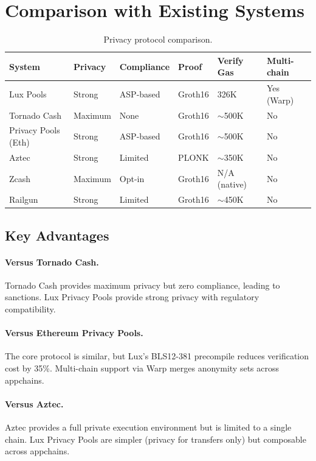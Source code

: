 \section{Comparison with Existing Systems}
\label{sec:comparison}

\begin{table}[H]
\centering
\caption{Privacy protocol comparison.}
\label{tab:comparison}
\begin{tabular}{p{2.2cm}p{1.8cm}p{1.8cm}p{1.8cm}p{2cm}p{2cm}}
\toprule
\textbf{System} & \textbf{Privacy} & \textbf{Compliance} & \textbf{Proof} & \textbf{Verify Gas} & \textbf{Multi-chain} \\
\midrule
Lux Pools & Strong & ASP-based & Groth16 & 326K & Yes (Warp) \\
Tornado Cash & Maximum & None & Groth16 & $\sim$500K & No \\
Privacy Pools (Eth) & Strong & ASP-based & Groth16 & $\sim$500K & No \\
Aztec & Strong & Limited & PLONK & $\sim$350K & No \\
Zcash & Maximum & Opt-in & Groth16 & N/A (native) & No \\
Railgun & Strong & Limited & Groth16 & $\sim$450K & No \\
\bottomrule
\end{tabular}
\end{table}

\subsection{Key Advantages}

\paragraph{Versus Tornado Cash.} Tornado Cash provides maximum privacy but zero compliance, leading to sanctions. Lux Privacy Pools provide strong privacy with regulatory compatibility.

\paragraph{Versus Ethereum Privacy Pools.} The core protocol is similar, but Lux's BLS12-381 precompile reduces verification cost by 35\%. Multi-chain support via Warp merges anonymity sets across appchains.

\paragraph{Versus Aztec.} Aztec provides a full private execution environment but is limited to a single chain. Lux Privacy Pools are simpler (privacy for transfers only) but composable across appchains.

